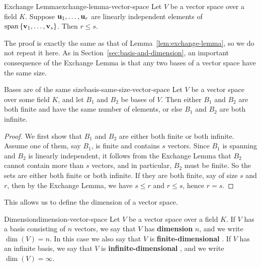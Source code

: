 \begin{lemma}{Exchange Lemma}{exchange-lemma-vector-space}
  Let $V$ be a vector space over a field $K$. Suppose
  $\mbox{\bf u}_{1},\ldots,\mbox{\bf u}_{r}$ are linearly independent elements
  of $\sspan\set{\vect{v}_{1},\ldots,\vect{v}_{s}}$. Then $r\leq s$.
\end{lemma}

The proof is exactly the same as that of
Lemma~\ref{lem:exchange-lemma}, so we do not repeat it here.  As in
Section~\ref{sec:basis-and-dimension}, an important consequence of the
Exchange Lemma is that any two bases of a vector space have the same
size.

\begin{theorem}{Bases are of the same size}{basis-same-size-vector-space}
  Let $V$ be a vector space over some field $K$, and let $B_1$ and
  $B_2$ be bases of $V$. Then either $B_1$ and $B_2$ are both finite
  and have the same number of elements, or else $B_1$ and $B_2$ are
  both infinite.
\end{theorem}

\begin{proof}
  We first show that $B_1$ and $B_2$ are either both finite or both
  infinite. Assume one of them, say $B_1$, is finite and contains $s$
  vectors. Since $B_1$ is spanning and $B_2$ is linearly independent,
  it follows from the Exchange Lemma that $B_2$ cannot contain more
  than $s$ vectors, and in particular, $B_2$ must be finite.  So the
  sets are either both finite or both infinite. If they are both
  finite, say of size $s$ and $r$, then by the Exchange Lemma, we have
  $s\leq r$ and $r\leq s$, hence $r=s$.
\end{proof}

This allows us to define the dimension of a vector space.

\begin{definition}{Dimension}{dimension-vector-space}
  Let $V$ be a vector space over a field $K$. If $V$ has a basis
  consisting of $n$ vectors, we say that $V$ has \textbf{dimension}%
   $n$, and we write $\dim(V)=n$. In
  this case we also say that $V$ is \textbf{finite-dimensional}%
  . If $V$ has an infinite
  basis, we say that $V$ is \textbf{infinite-dimensional}%
  , and we write $\dim(V) = \infty$.
\end{definition}


